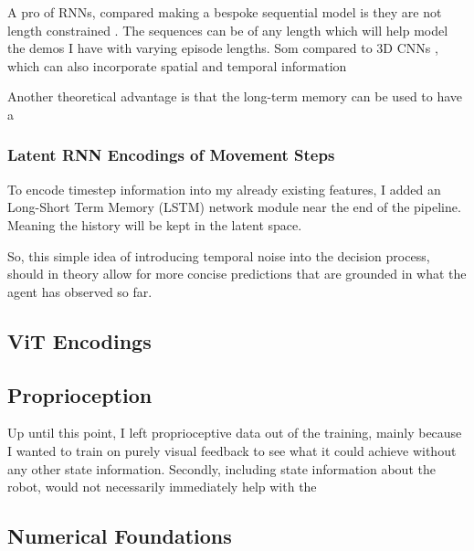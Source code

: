 A pro of RNNs, compared making a bespoke sequential model is they are not length constrained . The sequences can be of any length which will help model the demos I have with varying episode lengths. Som compared to 3D CNNs , which can also incorporate spatial and temporal information 


Another theoretical advantage is that the long-term memory can be used to have a 

\subsubsection{Latent RNN Encodings of Movement Steps}
To encode timestep information into my already existing features, I added an Long-Short Term Memory (LSTM) network module near the end of the pipeline. Meaning the history will be kept in the latent space.

So, this simple idea of introducing temporal noise into the decision process, should in theory allow for more concise predictions that are grounded in what the agent has observed so far.

\subsection{ViT Encodings}



\subsection{Proprioception}
Up until this point, I left proprioceptive data out of the training, mainly because I wanted to train on purely visual feedback to see what it could achieve without any other state information. Secondly, including state information about the robot, would not necessarily immediately help with the 

\subsection{Numerical Foundations}

